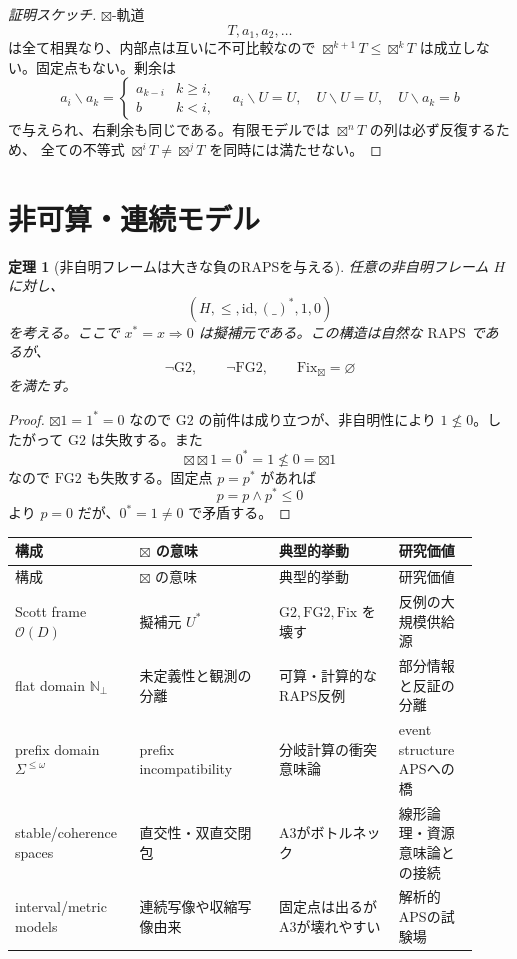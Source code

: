 \documentclass[uplatex,dvipdfmx,a4paper,10pt]{jsarticle}
\newtheorem{theorem}{定理}
\newcommand{\RAPS}{\mathrm{RAPS}}
\newcommand{\Gtwo}{\mathrm{G2}}
\newcommand{\FGtwo}{\mathrm{FG2}}
\newcommand{\Fix}{\mathrm{Fix}}
\newcommand{\bt}{\boxtimes}
\newcommand{\resl}{\backslash}
\begin{document}
\begin{proof}[証明スケッチ]
\(\bt\)-軌道
\[
T,a_1,a_2,\ldots
\]
は全て相異なり、内部点は互いに不可比較なので \(\bt^{k+1}T\le\bt^kT\)
は成立しない。固定点もない。剰余は
\[
a_i\resl a_k=
\begin{cases}
a_{k-i} & k\ge i,\\
b & k<i,
\end{cases}
\quad
a_i\resl U=U,\quad
U\resl U=U,\quad
U\resl a_k=b
\]
で与えられ、右剰余も同じである。有限モデルでは \(\bt^nT\) の列は必ず反復するため、
全ての不等式 \(\bt^iT\ne\bt^jT\) を同時には満たせない。
\end{proof}

\section{非可算・連続モデル}

\begin{theorem}[非自明フレームは大きな負のRAPSを与える]
任意の非自明フレーム \(H\) に対し、
\[
(H,\le,\mathrm{id},(\_)^\ast,1,0)
\]
を考える。ここで \(x^\ast=x\Rightarrow0\) は擬補元である。この構造は自然な
\(\RAPS\) であるが、
\[
\neg\Gtwo,\qquad \neg\FGtwo,\qquad \Fix_{\bt}=\varnothing
\]
を満たす。
\end{theorem}

\begin{proof}
\(\bt1=1^\ast=0\) なので \(\Gtwo\) の前件は成り立つが、非自明性により
\(1\not\le0\)。したがって \(\Gtwo\) は失敗する。また
\[
\bt\bt1=0^\ast=1\not\le0=\bt1
\]
なので \(\FGtwo\) も失敗する。固定点 \(p=p^\ast\) があれば
\[
p=p\wedge p^\ast\le0
\]
より \(p=0\) だが、\(0^\ast=1\ne0\) で矛盾する。
\end{proof}

\begin{longtable}{>{\raggedright\arraybackslash}p{0.24\linewidth}
                  >{\raggedright\arraybackslash}p{0.28\linewidth}
                  >{\raggedright\arraybackslash}p{0.24\linewidth}
                  >{\raggedright\arraybackslash}p{0.16\linewidth}}
\toprule
構成 & \(\bt\) の意味 & 典型的挙動 & 研究価値 \\
\midrule
\endfirsthead
\toprule
構成 & \(\bt\) の意味 & 典型的挙動 & 研究価値 \\
\midrule
\endhead
Scott frame \(\mathcal O(D)\) &
擬補元 \(U^\ast\) &
\(\Gtwo,\FGtwo,\Fix\) を壊す &
反例の大規模供給源 \\
\midrule
flat domain \(\mathbb N_\bot\) &
未定義性と観測の分離 &
可算・計算的なRAPS反例 &
部分情報と反証の分離 \\
\midrule
prefix domain \(\Sigma^{\le\omega}\) &
prefix incompatibility &
分岐計算の衝突意味論 &
event structure APSへの橋 \\
\midrule
stable/coherence spaces &
直交性・双直交閉包 &
A3がボトルネック &
線形論理・資源意味論との接続 \\
\midrule
interval/metric models &
連続写像や収縮写像由来 &
固定点は出るがA3が壊れやすい &
解析的APSの試験場 \\
\bottomrule
\end{longtable}
\end{document}
